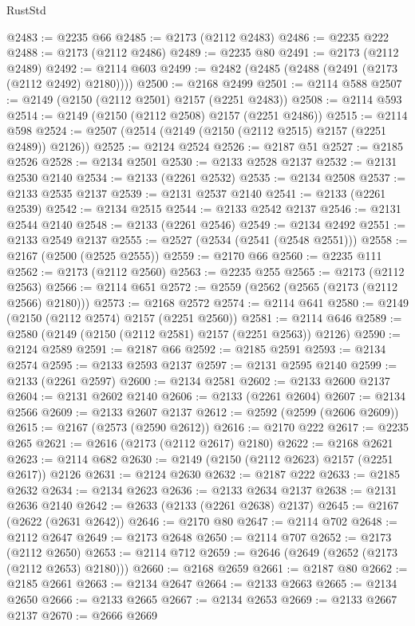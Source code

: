 \begin{lexlean}{RustStd}
\begin{coremodule}
@2483 := @2235 @66
@2485 := @2173 (@2112 @2483)
@2486 := @2235 @222
@2488 := @2173 (@2112 @2486)
@2489 := @2235 @80
@2491 := @2173 (@2112 @2489)
@2492 := @2114 @603
@2499 := @2482 (@2485 (@2488 (@2491 (@2173 (@2112 @2492) @2180))))
@2500 := @2168 @2499
@2501 := @2114 @588
@2507 := @2149 (@2150 (@2112 @2501) @2157 (@2251 @2483))
@2508 := @2114 @593
@2514 := @2149 (@2150 (@2112 @2508) @2157 (@2251 @2486))
@2515 := @2114 @598
@2524 := @2507 (@2514 (@2149 (@2150 (@2112 @2515) @2157 (@2251 @2489)) @2126))
@2525 := @2124 @2524
@2526 := @2187 @51
@2527 := @2185 @2526
@2528 := @2134 @2501
@2530 := @2133 @2528 @2137
@2532 := @2131 @2530 @2140
@2534 := @2133 (@2261 @2532)
@2535 := @2134 @2508
@2537 := @2133 @2535 @2137
@2539 := @2131 @2537 @2140
@2541 := @2133 (@2261 @2539)
@2542 := @2134 @2515
@2544 := @2133 @2542 @2137
@2546 := @2131 @2544 @2140
@2548 := @2133 (@2261 @2546)
@2549 := @2134 @2492
@2551 := @2133 @2549 @2137
@2555 := @2527 (@2534 (@2541 (@2548 @2551)))
@2558 := @2167 (@2500 (@2525 @2555))
@2559 := @2170 @66
@2560 := @2235 @111
@2562 := @2173 (@2112 @2560)
@2563 := @2235 @255
@2565 := @2173 (@2112 @2563)
@2566 := @2114 @651
@2572 := @2559 (@2562 (@2565 (@2173 (@2112 @2566) @2180)))
@2573 := @2168 @2572
@2574 := @2114 @641
@2580 := @2149 (@2150 (@2112 @2574) @2157 (@2251 @2560))
@2581 := @2114 @646
@2589 := @2580 (@2149 (@2150 (@2112 @2581) @2157 (@2251 @2563)) @2126)
@2590 := @2124 @2589
@2591 := @2187 @66
@2592 := @2185 @2591
@2593 := @2134 @2574
@2595 := @2133 @2593 @2137
@2597 := @2131 @2595 @2140
@2599 := @2133 (@2261 @2597)
@2600 := @2134 @2581
@2602 := @2133 @2600 @2137
@2604 := @2131 @2602 @2140
@2606 := @2133 (@2261 @2604)
@2607 := @2134 @2566
@2609 := @2133 @2607 @2137
@2612 := @2592 (@2599 (@2606 @2609))
@2615 := @2167 (@2573 (@2590 @2612))
@2616 := @2170 @222
@2617 := @2235 @265
@2621 := @2616 (@2173 (@2112 @2617) @2180)
@2622 := @2168 @2621
@2623 := @2114 @682
@2630 := @2149 (@2150 (@2112 @2623) @2157 (@2251 @2617)) @2126
@2631 := @2124 @2630
@2632 := @2187 @222
@2633 := @2185 @2632
@2634 := @2134 @2623
@2636 := @2133 @2634 @2137
@2638 := @2131 @2636 @2140
@2642 := @2633 (@2133 (@2261 @2638) @2137)
@2645 := @2167 (@2622 (@2631 @2642))
@2646 := @2170 @80
@2647 := @2114 @702
@2648 := @2112 @2647
@2649 := @2173 @2648
@2650 := @2114 @707
@2652 := @2173 (@2112 @2650)
@2653 := @2114 @712
@2659 := @2646 (@2649 (@2652 (@2173 (@2112 @2653) @2180)))
@2660 := @2168 @2659
@2661 := @2187 @80
@2662 := @2185 @2661
@2663 := @2134 @2647
@2664 := @2133 @2663
@2665 := @2134 @2650
@2666 := @2133 @2665
@2667 := @2134 @2653
@2669 := @2133 @2667 @2137
@2670 := @2666 @2669

\end{coremodule}
\end{lexlean}
